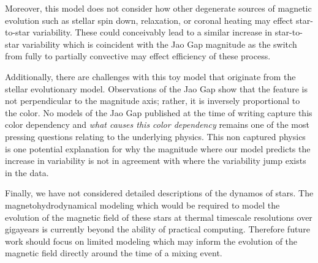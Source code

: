 Moreover, this model does not consider how other degenerate sources of magnetic evolution such as stellar spin down, relaxation, or coronal heating may effect star-to-star variability. These could conceivably lead to a similar increase in star-to-star variability which is coincident with the Jao Gap magnitude as the switch from fully to partially convective may effect efficiency of these process.

Additionally, there are challenges with this toy model that originate from the stellar evolutionary model. Observations of the Jao Gap show that the feature is not perpendicular to the magnitude axis; rather, it is inversely proportional to the color. No models of the Jao Gap published at the time of writing capture this color dependency and \textit{what causes this color dependency} remains one of the most pressing questions relating to the underlying physics. This non captured physics is one potential explanation for why the magnitude where our model predicts the increase in variability is not in agreement with where the variability jump exists in the data.

Finally, we have not considered detailed descriptions of the dynamos of stars. The magnetohydrodynamical modeling which would be required to model the evolution of the magnetic field of these stars at thermal timescale resolutions over gigayears is currently beyond the ability of practical computing. Therefore future work should focus on limited modeling which may inform the evolution of the magnetic field directly around the time of a mixing event.
